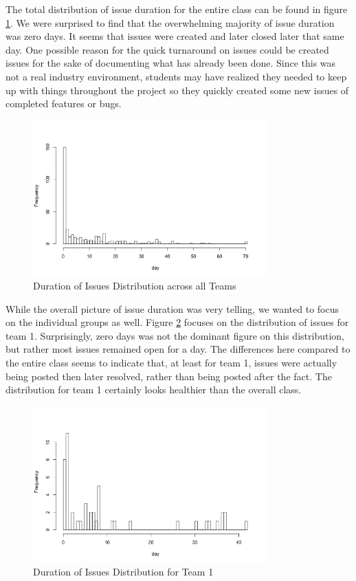 \documentclass[conference]{IEEEtran}
\begin{document}
The total distribution of issue duration for the entire class can be found in figure \ref{issue_duration_total}. We were surprised to find that the overwhelming majority of issue duration was zero days. It seems that issues were created and later closed later that same day. One possible reason for the quick turnaround on issues could be created issues for the sake of documenting what has already been done. Since this was not a real industry environment, students may have realized they needed to keep up with things throughout the project so they quickly created some new issues of completed features or bugs. 

\begin{figure}[H]
    \centering
    \includegraphics[width=9cm]{../AprilProject/pic/distribution/issue duration distribution total.png}
    \caption{Duration of Issues Distribution across all Teams}
    \label{issue_duration_total}
\end{figure}

While the overall picture of issue duration was very telling, we wanted to focus on the individual groups as well. Figure \ref{issue_duration_team1} focuses on the distribution of issues for team 1. Surprisingly, zero days was not the dominant figure on this distribution, but rather most issues remained open for a day. The differences here compared to the entire class seems to indicate that, at least for team 1, issues were actually being posted then later resolved, rather than being posted after the fact. The distribution for team 1 certainly looks healthier than the overall class.

\begin{figure}[H]
    \centering
    \includegraphics[width=9cm]{../AprilProject/pic/distribution/issue duration distribution team1.png}
    \caption{Duration of Issues Distribution for Team 1}
    \label{issue_duration_team1}
\end{figure}
\end{document}
